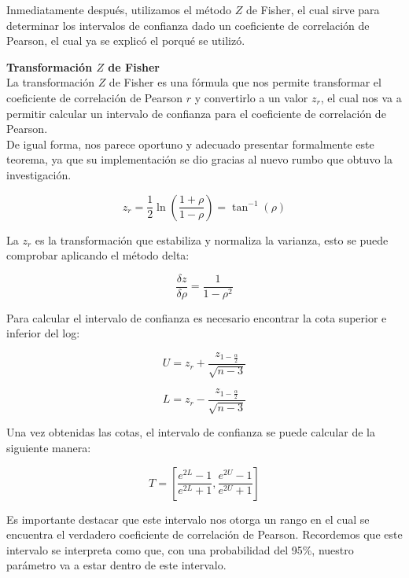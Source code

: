 Inmediatamente después, utilizamos el método $Z$ de Fisher, el cual sirve para determinar los intervalos de confianza dado un coeficiente de correlación de Pearson, el cual ya se explicó el porqué se utilizó. \\

\pagebreak

\textbf{Transformación $Z$ de Fisher} \\

La transformación $Z$ de Fisher es una fórmula que nos permite transformar el coeficiente de correlación de Pearson $r$ y convertirlo a un valor $z_r$, el cual nos va a permitir calcular un intervalo de confianza para el coeficiente de correlación de Pearson. \\

De igual forma, nos parece oportuno y adecuado presentar formalmente este teorema, ya que su implementación se dio gracias al nuevo rumbo que obtuvo la investigación. \\

    \begin{theorem}
        $$z_r=\frac{1}{2}\ln\left(\frac{1+\rho}{1-\rho}\right)=\tan^{-1}(\rho)$$
    
        La $z_r$ es la transformación que estabiliza y normaliza la varianza, esto se puede comprobar aplicando el método delta:
    
        $$\frac{\delta z}{\delta \rho}=\frac{1}{1-\rho^2}$$
    
        Para calcular el intervalo de confianza es necesario encontrar la cota superior e inferior del log:
    
        $$U=z_r + \frac{z_{1-\frac{\alpha}{2}}}{\sqrt{n-3}}$$    
    
        $$L=z_r - \frac{z_{1-\frac{\alpha}{2}}}{\sqrt{n-3}}$$
    
        Una vez obtenidas las cotas, el intervalo de confianza se puede calcular de la siguiente manera:
    
        $$T=\left[\frac{e^{2L}-1}{e^{2L}+1},\frac{e^{2U}-1}{e^{2U}+1}\right]$$

    \end{theorem}

Es importante destacar que este intervalo nos otorga un rango en el cual se encuentra el verdadero coeficiente de correlación de Pearson. Recordemos que este intervalo se interpreta como que, con una probabilidad del 95\%, nuestro parámetro va a estar dentro de este intervalo.\\

